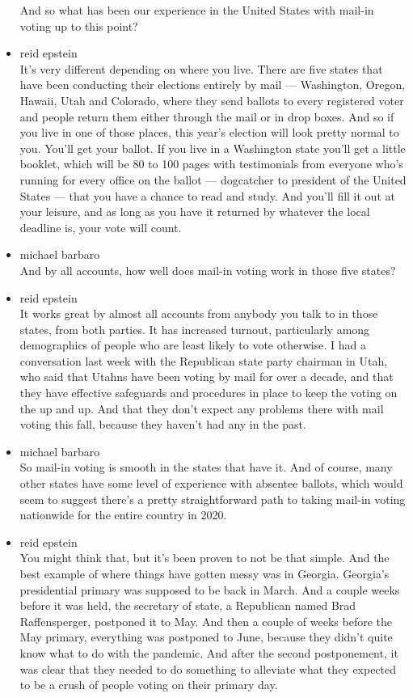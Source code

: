 \begin{itemize}
  And so what has been our experience in the United States with mail-in
  voting up to this point?
\item
  reid epstein\\
  It's very different depending on where you live. There are five states
  that have been conducting their elections entirely by mail ---
  Washington, Oregon, Hawaii, Utah and Colorado, where they send ballots
  to every registered voter and people return them either through the
  mail or in drop boxes. And so if you live in one of those places, this
  year's election will look pretty normal to you. You'll get your
  ballot. If you live in a Washington state you'll get a little booklet,
  which will be 80 to 100 pages with testimonials from everyone who's
  running for every office on the ballot --- dogcatcher to president of
  the United States --- that you have a chance to read and study. And
  you'll fill it out at your leisure, and as long as you have it
  returned by whatever the local deadline is, your vote will count.
\item
  michael barbaro\\
  And by all accounts, how well does mail-in voting work in those five
  states?
\item
  reid epstein\\
  It works great by almost all accounts from anybody you talk to in
  those states, from both parties. It has increased turnout,
  particularly among demographics of people who are least likely to vote
  otherwise. I had a conversation last week with the Republican state
  party chairman in Utah, who said that Utahns have been voting by mail
  for over a decade, and that they have effective safeguards and
  procedures in place to keep the voting on the up and up. And that they
  don't expect any problems there with mail voting this fall, because
  they haven't had any in the past.
\item
  michael barbaro\\
  So mail-in voting is smooth in the states that have it. And of course,
  many other states have some level of experience with absentee ballots,
  which would seem to suggest there's a pretty straightforward path to
  taking mail-in voting nationwide for the entire country in 2020.
\item
  reid epstein\\
  You might think that, but it's been proven to not be that simple. And
  the best example of where things have gotten messy was in Georgia.
  Georgia's presidential primary was supposed to be back in March. And a
  couple weeks before it was held, the secretary of state, a Republican
  named Brad Raffensperger, postponed it to May. And then a couple of
  weeks before the May primary, everything was postponed to June,
  because they didn't quite know what to do with the pandemic. And after
  the second postponement, it was clear that they needed to do something
  to alleviate what they expected to be a crush of people voting on
  their primary day.


\end{itemize}
